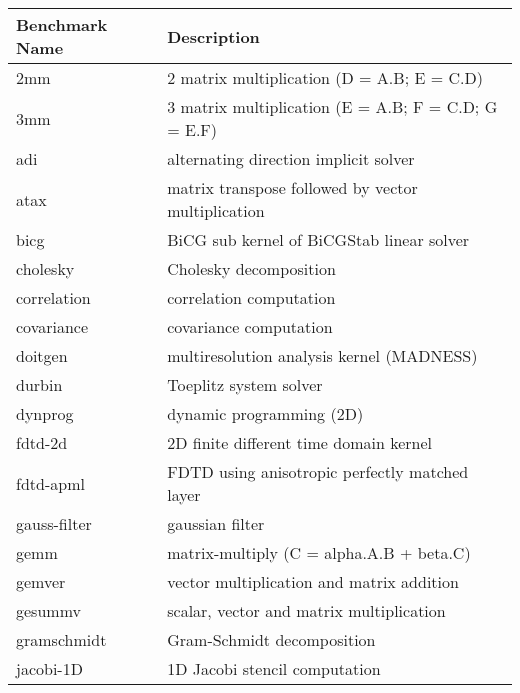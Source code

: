 \begin{tabular}{|l|l|}
    \hline
    \textbf{Benchmark Name} & \textbf{Description}                                \\ \hline
    2mm                     & 2 matrix multiplication (D = A.B; E = C.D)          \\ \hline
    3mm                     & 3 matrix multiplication (E = A.B; F = C.D; G = E.F) \\ \hline
    adi                     & alternating direction implicit solver               \\ \hline
    atax                    & matrix transpose followed by vector multiplication  \\ \hline
    bicg                    & BiCG sub kernel of BiCGStab linear solver           \\ \hline
    cholesky                & Cholesky decomposition                              \\ \hline
    correlation             & correlation computation                             \\ \hline
    covariance              & covariance computation                              \\ \hline
    doitgen                 & multiresolution analysis kernel (MADNESS)           \\ \hline
    durbin                  & Toeplitz system solver                              \\ \hline
    dynprog                 & dynamic programming (2D)                            \\ \hline
    fdtd-2d                 & 2D finite different time domain kernel              \\ \hline
    fdtd-apml               & FDTD using anisotropic perfectly matched layer      \\ \hline
    gauss-filter            & gaussian filter                                     \\ \hline
    gemm                    & matrix-multiply (C = alpha.A.B + beta.C)            \\ \hline
    gemver                  & vector multiplication and matrix addition           \\ \hline
    gesummv                 & scalar, vector and matrix multiplication            \\ \hline
    gramschmidt             & Gram-Schmidt decomposition                          \\ \hline
    jacobi-1D               & 1D Jacobi stencil computation                       \\ \hline

\end{tabular}
